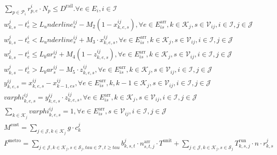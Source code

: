 \begin{align}
  & \sum_{p \in \mathcal{P}_{i}} r_{p , e}^{i} \cdot N_{p} \leq D^{\text{rail}} . \forall e \in E_{i} , i \in \mathcal{I} \tag{eq\_0034} \\
  & w_{k , s}^{j} - t_{e}^{i} \geq L_underline_{s}^{i j} - M_{2} \left(1 - x_{k , e , s}^{i j}\right) , \forall e \in E_{i s}^{\text{arr}} , k \in \mathcal{K}_{j} , s \in \mathcal{V}_{i j} , i \in \mathcal{I} , j \in \mathcal{J} \tag{eq\_0035} \\
  & w_{k , s}^{j} - t_{e}^{i} < L_underline_{s}^{i j} + M_{3} \cdot x_{k , e , s}^{i j} , \forall e \in E_{i s}^{\text{arr}} , k \in \mathcal{K}_{j} , s \in \mathcal{V}_{i j} , i \in \mathcal{I} , j \in \mathcal{J} \tag{eq\_0037} \\
  & w_{k , s}^{j} - t_{e}^{i} \leq L_bar_{s}^{i j} + M_{4} \left(1 - z_{k , e , s}^{i j}\right) , \forall e \in E_{i s}^{\text{arr}} , k \in \mathcal{K}_{j} , s \in \mathcal{V}_{i j} , i \in \mathcal{I} , j \in \mathcal{J} \tag{eq\_0038} \\
  & w_{k , s}^{j} - t_{e}^{i} > L_bar_{s}^{i j} - M_{5} \cdot z_{k , e , s}^{i j} , \forall e \in E_{i s}^{\text{arr}} , k \in \mathcal{K}_{j} , s \in \mathcal{V}_{i j} , i \in \mathcal{I} , j \in \mathcal{J} \tag{eq\_0039} \\
  & y_{k , e , s}^{i j} = x_{k , e , s}^{i j} - x_{k - 1 , e s}^{i j} , \forall e \in E_{i s}^{\text{arr}} , k , k - 1 \in \mathcal{K}_{j} , s \in \mathcal{V}_{i j} , i \in \mathcal{I} , j \in \mathcal{J} \tag{eq\_0040} \\
  & \mathit{varphi}_{k , e , s}^{i j} = y_{k , e , s}^{i j} \cdot z_{k , e , s}^{i j} , \forall e \in E_{i s}^{\text{arr}} , k \in \mathcal{K}_{j} , s \in \mathcal{V}_{i j} , i \in \mathcal{I} , j \in \mathcal{J} \tag{eq\_0041} \\
  & \sum_{k \in \mathcal{K}_{j}} \mathit{varphi}_{k , e , s}^{i j} = 1 , \forall e \in E_{i s}^{\text{arr}} , s \in \mathcal{V}_{i j} , i \in \mathcal{I} , j \in \mathcal{J} \tag{eq\_0042} \\
  & M^{\text{cost}} = \sum_{j \in \mathcal{J}, k \in \mathcal{K}_{j}} g \cdot c_{k}^{j} \tag{eq\_0043} \\
  & F^{\text{metro}} = \sum_{j \in \mathcal{J}, k \in \mathcal{K}_{j}, s \in \mathcal{S}_{j}, \mathit{tau} \in \mathcal{T}, t \geq \mathit{tau}} b_{k , s , t}^{j} \cdot n_{s , t , j}^{\text{arr}} \cdot T^{\text{unit}} + \sum_{j \in \mathcal{J}, k \in \mathcal{K}_{j}, s \in \mathcal{S}_{j}} T_{k , s , j}^{\text{run}} \cdot n \cdot r_{k , s}^{j} \tag{eq\_0044} \\

\end{align}
